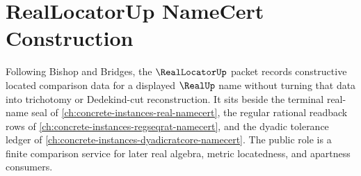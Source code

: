 \chapter{RealLocatorUp NameCert Construction}
\label{ch:concrete-instances-real-locator-namecert}

Following Bishop and Bridges, the $\RealLocatorUp$ packet records constructive located comparison data for a displayed $\RealUp$ name without turning that data into trichotomy or Dedekind-cut reconstruction. It sits beside the terminal real-name seal of \autoref{ch:concrete-instances-real-namecert}, the regular rational readback rows of \autoref{ch:concrete-instances-regseqrat-namecert}, and the dyadic tolerance ledger of \autoref{ch:concrete-instances-dyadicratcore-namecert}. The public role is a finite comparison service for later real algebra, metric locatedness, and apartness consumers.

